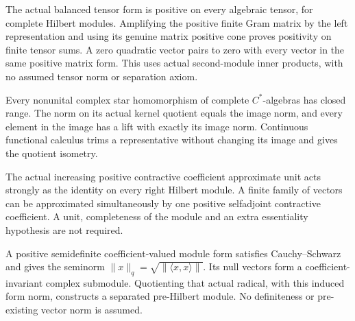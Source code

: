 \begin{proposition}\label{prop:balanced-module-tensor-positivity}
\leanok
The actual balanced tensor form is positive on every algebraic tensor, for
complete Hilbert modules. Amplifying the positive finite Gram matrix by the
left representation and using its genuine matrix positive cone proves
positivity on finite tensor sums. A zero quadratic vector pairs to zero with
every vector in the same positive matrix form. This uses actual second-module
inner products, with no assumed tensor norm or separation axiom.
\end{proposition}

\begin{proposition}\label{prop:nonunital-cstar-hom-range}
\leanok
Every nonunital complex star homomorphism of complete $C^*$-algebras has
closed range. The norm on its actual kernel quotient equals the image norm,
and every element in the image has a lift with exactly its image norm.
Continuous functional calculus trims a representative without changing its
image and gives the quotient isometry.
\end{proposition}

\begin{proposition}\label{prop:coefficient-au-on-modules}
\leanok
The actual increasing positive contractive coefficient approximate unit acts
strongly as the identity on every right Hilbert module. A finite family of
vectors can be approximated simultaneously by one positive selfadjoint
contractive coefficient. A unit, completeness of the module and an extra
essentiality hypothesis are not required.
\end{proposition}

\begin{proposition}\label{prop:positive-module-form-quotient}
\leanok
A positive semidefinite coefficient-valued module form satisfies
Cauchy--Schwarz and gives the seminorm
$\|x\|_q=\sqrt{\|\langle x,x\rangle\|}$. Its null vectors form a
coefficient-invariant complex submodule. Quotienting that actual radical,
with this induced form norm, constructs a separated pre-Hilbert module.
No definiteness or pre-existing vector norm is assumed.
\end{proposition}

